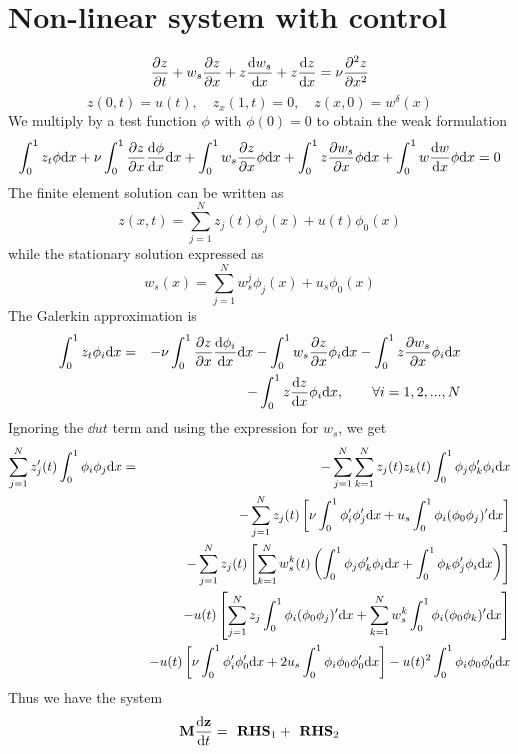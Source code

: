 \documentclass[12pt]{article}
\begin{document}
\section{Non-linear system with control}
\begin{equation*}
\frac{\partial z}{\partial t} + w_s \frac{\partial z}{\partial x} + z \frac{\textrm{d} w_s}{\textrm{d} x} + z \frac{\textrm{d} z}{\textrm{d} x} = \nu \frac{\partial ^2 z}{\partial x^2}
\end{equation*}
\begin{equation*}
z(0,t) = u(t), \quad z_x(1,t) = 0,  \quad z(x,0) = w^\delta(x)
\end{equation*}
We multiply by a test function $\phi$ with $\phi(0)=0$ to obtain the weak formulation
\[
\int_0^1 z_t \phi \textrm{d} x + \nu \int_0^1 \frac{\partial z}{\partial x} \frac{\textrm{d} \phi}{\textrm{d} x} \textrm{d} x + \int_0^1 w_s \frac{\partial z}{\partial x} \phi \textrm{d} x + \int_0^1 z \frac{\partial w_s}{\partial x} \phi \textrm{d} x + \int_0^1 w \frac{\textrm{d} w}{\textrm{d} x} \phi \textrm{d} x = 0
\]
The finite element solution can be written as
\[
z(x,t) = \sum_{j=1}^N z_j(t) \phi_j(x) + u(t) \phi_0(x)
\]
while the stationary solution expressed as
\[
w_s(x) = \sum_{j=1}^N w_s^j \phi_j(x) + u_s \phi_0(x)
\]
The Galerkin approximation is
\begin{eqnarray*}
\int_0^1 z_t \phi_i \textrm{d} x &=& - \nu \int_0^1 \frac{\partial z}{\partial x} \frac{\textrm{d} \phi_i}{\textrm{d} x} \textrm{d} x - \int_0^1 w_s \frac{\partial z}{\partial x} \phi_i \textrm{d} x - \int_0^1 z \frac{\partial w_s}{\partial x} \phi_i \textrm{d} x \\
&& - \int_0^1 z \frac{\textrm{d} z}{\textrm{d} x} \phi_i \textrm{d} x, \qquad \forall i=1,2,...,N
\end{eqnarray*}
Ignoring the $\dd{u}{t}$ term and using the expression for $w_s$, we get
\begin{eqnarray*}
\sum_{j=1}^N z_j'(t) \int_0^1 \phi_i \phi_j \textrm{d} x &=& - \sum_{j=1}^N \sum_{k=1}^N z_j(t) z_k(t) \int_0^1 \phi_j \phi_k' \phi_i  \textrm{d} x \\ 
&& - \sum_{j=1}^N z_j(t) \left [ \nu  \int_0^1 \phi_i' \phi_j' \textrm{d} x + u_s \int_0^1 \phi_i (\phi_0 \phi_j)' \textrm{d} x  \right ] \\
&& - \sum_{j=1}^N z_j(t) \left [  \sum_{k=1}^N w_s^k(t) \left ( \int_0^1 \phi_j \phi_k' \phi_i \textrm{d} x +  \int_0^1 \phi_k \phi_j' \phi_i \textrm{d} x \right ) \right]\\
&& - u(t) \left [\sum_{j=1}^N z_j \int_0^1 \phi_i (\phi_0 \phi_j)' \textrm{d} x  + \sum_{k=1}^N w_s^k \int_0^1 \phi_i (\phi_0 \phi_k)' \textrm{d} x \right ]\\
&& -  u(t) \left[ \nu \int_0^1 \phi_i' \phi_0' \textrm{d} x + 2 u_s \int_0^1 \phi_i \phi_0 \phi_0' \textrm{d} x \right] - u(t)^2 \int_0^1 \phi_i \phi_0 \phi_0' \textrm{d} x
\end{eqnarray*}
Thus we have the system
\begin{eqnarray*}
 {\mathbf M} \frac{\textrm{d} {\mathbf z}}{\textrm{d} t} = \textbf{ RHS}_1 + \textbf{ RHS}_2 
\end{eqnarray*}
\end{document}

